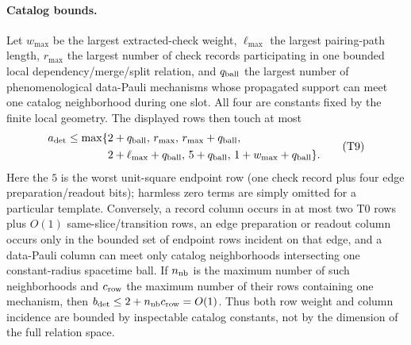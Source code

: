\documentclass[aps,prx,reprint,superscriptaddress,nofootinbib,floatfix,longbibliography]{revtex4-2}
\theoremstyle{definition}
\begin{document}
\paragraph{Catalog bounds.}
Let $w_{\max}$ be the largest extracted-check weight, $\ell_{\max}$ the
largest pairing-path length, $r_{\max}$ the largest number of check records
participating in one bounded local dependency/merge/split relation, and
$q_{\rm ball}$ the largest number of phenomenological data-Pauli mechanisms
whose propagated support can meet one catalog neighborhood during one slot.
All four are constants fixed by the finite local geometry.  The displayed
rows then touch at most
\begin{equation}
 \begin{split}
 a_{\rm det}\leq\max\{&2+q_{\rm ball},\,r_{\max},\,
 r_{\max}+q_{\rm ball},\\
 &2+\ell_{\max}+q_{\rm ball},\,5+q_{\rm ball},\,
 1+w_{\max}+q_{\rm ball}\}.
 \end{split}
 \tag{T9}
\end{equation}
Here the $5$ is the worst unit-square endpoint row (one check record plus four
edge preparation/readout bits); harmless zero terms are simply omitted for a
particular template.  Conversely, a record column occurs in at most two T0
rows plus $O(1)$ same-slice/transition rows, an edge preparation or readout
column occurs only in the bounded set of endpoint rows incident on that edge,
and a data-Pauli column can meet only catalog neighborhoods intersecting one
constant-radius spacetime ball.  If $n_{\rm nb}$ is the maximum number of such
neighborhoods and $c_{\rm row}$ the maximum number of their rows containing
one mechanism, then $b_{\rm det}\leq 2+n_{\rm nb}c_{\rm row}=O(1)$.
Thus both row weight and column incidence are bounded by inspectable catalog
constants, not by the dimension of the full relation space.
\end{document}
